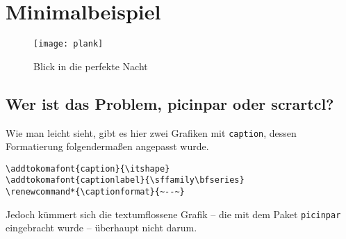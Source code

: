 \documentclass[a4paper,fontsize=12pt,parskip=half]{scrartcl}
\renewcommand*{\captionformat}{~--~}
\begin{document}
 
\section*{Minimalbeispiel} 
\lipsum*[2] 

\begin{figure}[h!] 
\centering 
\texttt{[image: plank]} 
\caption{Blick in die perfekte Nacht} 
\end{figure} 

\begin{figwindow} 
\lipsum*[3] 
\end{figwindow} 

\subsection*{Wer ist das Problem, picinpar oder scrartcl?} 
Wie man leicht sieht, gibt es hier zwei Grafiken mit \texttt{caption}, 
dessen Formatierung folgendermaßen angepasst wurde. 

\begin{Verbatim}[fontsize=\footnotesize] 
\addtokomafont{caption}{\itshape} 
\addtokomafont{captionlabel}{\sffamily\bfseries} 
\renewcommand*{\captionformat}{~--~} 
\end{Verbatim} 

Jedoch kümmert sich die textumflossene Grafik -- die mit dem Paket 
\texttt{picinpar} eingebracht wurde -- überhaupt nicht darum. 
\end{document}

